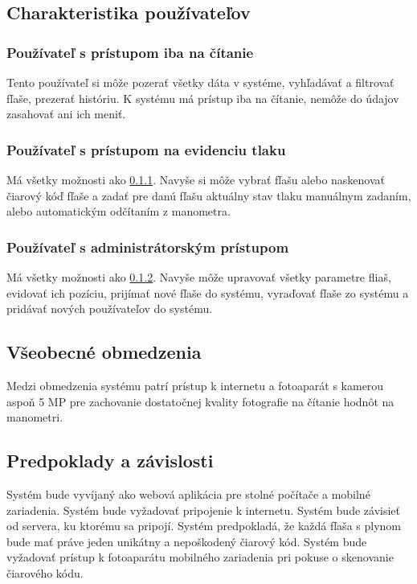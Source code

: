\documentclass[hreffootnote]{zah}
\begin{document}
\subsection{Charakteristika používateľov}
\label{gen:users}

\subsubsection{Používateľ s prístupom iba na čítanie}
\label{gen:users:ro}

Tento používateľ si môže pozerať všetky dáta v systéme, vyhľadávať a filtrovať fľaše, prezerať históriu. K systému má prístup iba na čítanie, nemôže do údajov zasahovať ani ich meniť.

\subsubsection{Používateľ s prístupom na evidenciu tlaku}
\label{gen:users:meter}

Má všetky možnosti ako \ref{gen:users:ro}. Navyše si môže vybrať fľašu alebo naskenovať čiarový kóď fľaše a zadať pre danú fľašu aktuálny stav tlaku manuálnym zadaním, alebo automatickým odčítaním z manometra.

\subsubsection{Používateľ s administrátorským prístupom}
\label{gen:users:admin}

Má všetky možnosti ako \ref{gen:users:meter}. Navyše môže upravovať všetky parametre fliaš, evidovať ich pozíciu, prijímať nové fľaše do systému, vyraďovať fľaše zo systému a pridávať nových používateľov do systému.

\subsection{Všeobecné obmedzenia}
\label{gen:constraints}

Medzi obmedzenia systému patrí prístup k internetu a fotoaparát s kamerou aspoň 5 MP pre zachovanie dostatočnej kvality fotografie na čítanie hodnôt na manometri. 

\subsection{Predpoklady a závislosti}
\label{gen:deps}

Systém bude vyvíjaný ako webová aplikácia pre stolné počítače a mobilné zariadenia. Systém bude vyžadovať pripojenie k internetu. Systém bude závisieť od servera, ku ktorému sa pripojí. Systém predpokladá, že každá fľaša s plynom bude mať práve jeden unikátny a nepoškodený čiarový kód. Systém bude vyžadovať prístup k fotoaparátu mobilného zariadenia pri pokuse o skenovanie čiarového kódu.
\end{document}

